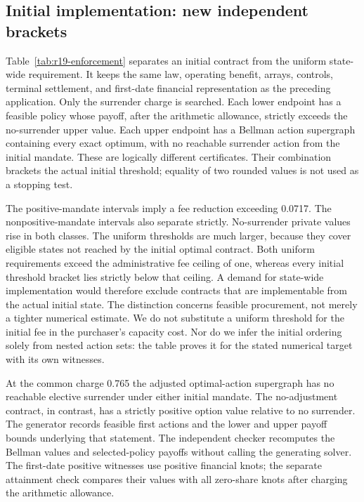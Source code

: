 \subsection{Initial implementation: new independent brackets}
\label{sec:r19-threshold-evidence}
Table~\ref{tab:r19-enforcement} separates an initial contract from the uniform state-wide requirement. It keeps the same law, operating benefit, arrays, controls, terminal settlement, and first-date financial representation as the preceding application. Only the surrender charge is searched. Each lower endpoint has a feasible policy whose payoff, after the arithmetic allowance, strictly exceeds the no-surrender upper value. Each upper endpoint has a Bellman action supergraph containing every exact optimum, with no reachable surrender action from the initial mandate. These are logically different certificates. Their combination brackets the actual initial threshold; equality of two rounded values is not used as a stopping test.



The positive-mandate intervals imply a fee reduction exceeding 0.0717. The nonpositive-mandate intervals also separate strictly. No-surrender private values rise in both classes. The uniform thresholds are much larger, because they cover eligible states not reached by the initial optimal contract. Both uniform requirements exceed the administrative fee ceiling of one, whereas every initial threshold bracket lies strictly below that ceiling. A demand for state-wide implementation would therefore exclude contracts that are implementable from the actual initial state. The distinction concerns feasible procurement, not merely a tighter numerical estimate. We do not substitute a uniform threshold for the initial fee in the purchaser's capacity cost. Nor do we infer the initial ordering solely from nested action sets: the table proves it for the stated numerical target with its own witnesses.

At the common charge 0.765 the adjusted optimal-action supergraph has no reachable elective surrender under either initial mandate. The no-adjustment contract, in contrast, has a strictly positive option value relative to no surrender. The generator records feasible first actions and the lower and upper payoff bounds underlying that statement. The independent checker recomputes the Bellman values and selected-policy payoffs without calling the generating solver. The first-date positive witnesses use positive financial knots; the separate attainment check compares their values with all zero-share knots after charging the arithmetic allowance.

